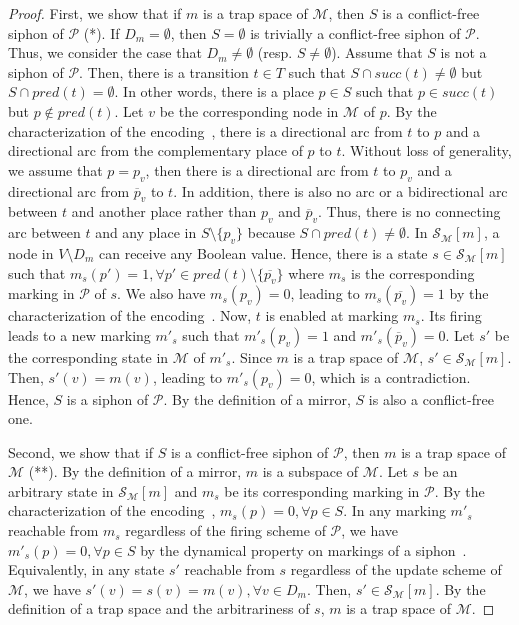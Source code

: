 \documentclass[runningheads]{llncs}
\begin{document}
\begin{proof}

  First, we show that if \(m\) is a trap space of \(\mathcal{M}\), then \(S\) is a conflict-free siphon of \(\mathcal{P}\) (*). If \(D_m = \emptyset\), then \(S = \emptyset\) is trivially a conflict-free siphon of \(\mathcal{P}\). Thus, we consider the case that \(D_m \neq \emptyset\) (resp. \(S \neq \emptyset\)). Assume that \(S\) is not a siphon of \(\mathcal{P}\). Then, there is a transition \(t \in T\) such that \(S\cap succ(t)\not =\emptyset\) but \(S\cap pred(t)=\emptyset\). In other words, there is a place \(p \in S\) such that \(p \in succ(t)\) but \(p \not \in pred(t)\). Let \(v\) be the corresponding node in \(\mathcal{M}\) of \(p\). By the characterization of the encoding~\cite{chaouiya2004qualitative}, there is a directional arc from \(t\) to \(p\) and a directional arc from the complementary place of \(p\) to \(t\). Without loss of generality, we assume that \(p = p_v\), then there is a directional arc from \(t\) to \(p_v\) and a directional arc from \(\overline{p}_v\) to \(t\). In addition, there is also no arc or a bidirectional arc between \(t\) and another place rather than \(p_v\) and \(\overline{p}_v\). Thus, there is no connecting arc between \(t\) and any place in \(S \setminus \{p_v\}\) because \(S\cap pred(t)\not =\emptyset\). In \(\mathcal{S}_{\mathcal{M}}[m]\), a node in \(V \setminus D_m\) can receive any Boolean value. Hence, there is a state \(s \in \mathcal{S}_{\mathcal{M}}[m]\) such that \(m_s(p') = 1, \forall p' \in pred(t) \setminus \{\overline{p_v}\}\) where \(m_s\) is the corresponding marking in \(\mathcal{P}\) of \(s\). We also have \(m_s(p_v) = 0\), leading to \(m_s(\overline{p_v}) = 1\) by the characterization of the encoding~\cite{chaouiya2004qualitative}. Now, \(t\) is enabled at marking \(m_s\). Its firing leads to a new marking \(m'_s\) such that \(m'_s(p_v) = 1\) and \(m'_s(\overline{p}_v) = 0\). Let \(s'\) be the corresponding state in \(\mathcal{M}\) of \(m'_s\). Since \(m\) is a trap space of \(\mathcal{M}\), \(s' \in \mathcal{S}_{\mathcal{M}}[m]\). Then, \(s'(v) = m(v)\), leading to \(m'_s(p_v) = 0\), which is a contradiction. Hence, \(S\) is a siphon of \(\mathcal{P}\). By the definition of a mirror, \(S\) is also a conflict-free one.
  
  Second, we show that if \(S\) is a conflict-free siphon of \(\mathcal{P}\), then \(m\) is a trap space of \(\mathcal{M}\) (**). By the definition of a mirror, \(m\) is a subspace of \(\mathcal{M}\). Let \(s\) be an arbitrary state in \(\mathcal{S}_{\mathcal{M}}[m]\) and \(m_s\) be its corresponding marking in \(\mathcal{P}\). By the characterization of the encoding~\cite{chaouiya2004qualitative}, \(m_s(p) = 0, \forall p \in S\). In any marking \(m'_s\) reachable from \(m_s\) regardless of the firing scheme of \(\mathcal{P}\), we have \(m'_s(p) = 0, \forall p \in S\) by the dynamical property on markings of a siphon~\cite{DBLP:journals/isci/LiuB16}. Equivalently, in any state \(s'\) reachable from \(s\) regardless of the update scheme of \(\mathcal{M}\), we have \(s'(v) = s(v) = m(v), \forall v \in D_m\). Then, \(s' \in \mathcal{S}_{\mathcal{M}}[m]\). By the definition of a trap space and the arbitrariness of \(s\), \(m\) is a trap space of \(\mathcal{M}\).
  

\end{proof}
\end{document}
